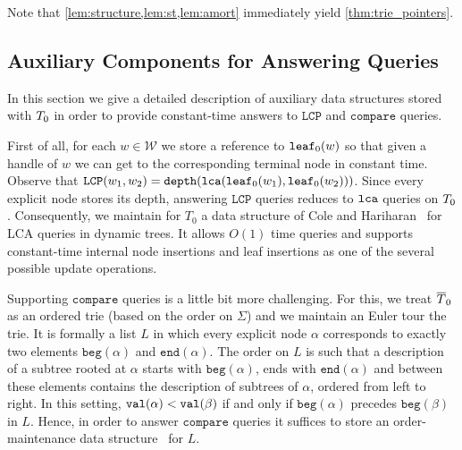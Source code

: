 \documentclass[a4paper]{article}
\theoremstyle{remark}
\newcommand{\compop}{\mathtt{compare}}
\newcommand{\lcpop}{\mathtt{LCP}}
\newcommand{\coll}{\mathcal{W}}
\begin{document}
Note that \cref{lem:structure,lem:st,lem:amort} immediately yield \cref{thm:trie_pointers}.

\subsection{Auxiliary Components for Answering Queries}\label{sec:trie_extra}
In this section we give a detailed description of auxiliary data structures stored with $T_0$
in order to provide constant-time answers to $\lcpop$ and $\compop$ queries.

First of all, for each $w\in \coll$ we store a reference to $\mathtt{leaf}_0(w)$ so that given a handle of $w$
we can get to the corresponding terminal node in constant time.
Observe that $\lcpop(w_1,w_2)=\tdepth(\tlca(\tleaf_0(w_1),\allowbreak\tleaf_0(w_2)))$.
Since every explicit node stores its depth, answering $\lcpop$ queries reduces to $\mathtt{lca}$ queries on $T_0$.
Consequently, we maintain for $T_0$ a data structure of Cole and Hariharan~\cite{Cole:2005} for LCA queries in dynamic trees.
It allows $O(1)$ time queries and supports constant-time internal node insertions and leaf insertions as one of the several possible update operations.

\newcommand{\tbeg}{\mathtt{beg}}
\newcommand{\tend}{\mathtt{end}}

Supporting $\compop$ queries is a little bit more challenging. For this, we treat $\overline{T}_0$ as an ordered trie (based on the order on $\Sigma$)
and we maintain an Euler tour the trie. It is formally a list $L$ in which every explicit node $\alpha$ corresponds to exactly two elements $\tbeg(\alpha)$ and $\tend(\alpha)$. The order on $L$ is such that a description of a subtree rooted at $\alpha$ starts with $\tbeg(\alpha)$, ends with $\tend(\alpha)$ and between these elements contains the description of subtrees of $\alpha$, ordered from left to right.
In this setting, $\mathtt{val}(\alpha)<\mathtt{val}(\beta)$ if and only if $\tbeg(\alpha)$ precedes $\tbeg(\beta)$ in $L$.
Hence, in order to answer $\compop$ queries it suffices to store an order-maintenance data structure~\cite{Dietz:1987,Bender:2002} for $L$.
\end{document}
